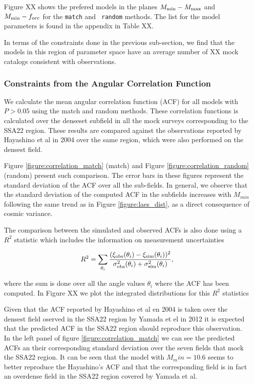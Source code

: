 \documentclass[usenatbib]{mn2e}
\begin{document}
Figure XX shows the prefered models in the planes $M_{\rm min}-M_{\rm
  max}$ and $M_{\rm min}-f_{\rm occ}$ for the {\tt match} and {\tt
  random} methods. The list for the model parameters is found in the
appendix in Table XX.  

In terms of the constraints done in the previous sub-section, we find
that the models in this region of parameter space have an average
number of XX mock catalogs consistent with observations. 

\subsubsection{Constraints from the Angular Correlation Function}

We calculate the mean angular correlation function (ACF) for all
models with $P>0.05$ using the match and random methods. These
correlation functions is calculated over the denseset subfield in all the
mock surveys corresponding to the SSA22 region. These results are
compared against the observations reported by Hayashino et al in 2004
over the same region, which were also performed on the densest field.  

Figure \ref{figure:correlation_match} (match) and Figure
\ref{figure:correlation_random} (random) present such comparison.  The
error bars in these figures represent the standard deviation of the
ACF over all the sub-fields.  In general, we observe that the standard
deviation of the computed ACF in the subfields increases with
$M_{min}$ following the same trend as in Figure
\ref{figure:laes_dist}, as a direct consequence of cosmic variance.  


The comparison between the simulated and observed ACFs is also done using a
$R^2$ statistic which includes the information on measurement uncertainties

\begin{equation}
R^{2} = \sum_{\theta_i} \frac{(\xi_{\rm obs}(\theta_i) - \xi_{\rm
    sim}(\theta_i))^2}{\sigma_{\rm obs}^2(\theta_i) + \sigma_{\rm
    sim}^2({\theta_i})}, 
\end{equation}

where the sum is done over all the angle values $\theta_i$ where the
ACF has been computed. In Figure XX we plot the integrated
distributions for this $R^{2}$ statistics 

Given that the ACF reported by Hayashino et al en 2004 is taken over
the densest  field oserved in the SSA22 region by  Yamada et el in
2012 it is expected that the predicted ACF in the SSA22 region should
reproduce this observation. In the  left panel of figure
\ref{figure:correlation_match} we can see the predicted ACFs  an their
corresponding standard deviation over the seven fields that mock the
SSA22  region. It can be seen that the model with $M_min=10.6$ seems
to better reproduce the  Hayashino's ACF and that the corresponding
field is in fact an overdense field in the SSA22 region covered by
Yamada et al. 
\end{document}
